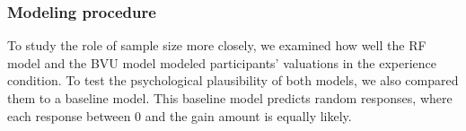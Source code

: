 \documentclass[a4paper, man, natbib, floatsintext]{apa6} %
\begin{document}



\subsubsection{Modeling procedure}
To study the role of sample size more closely, we examined how well the RF model and the BVU model modeled participants' valuations in the experience condition. To test the psychological plausibility of both models, we also compared them to a baseline model. This baseline model predicts random responses, where each response between 0 and the gain amount is equally likely. 
\end{document}
